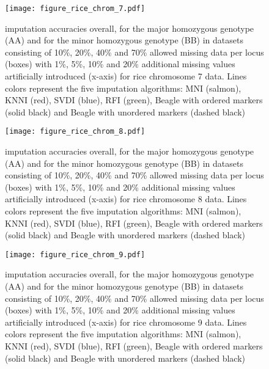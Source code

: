 \begin{figure}\texttt{[image: figure\_rice\_chrom\_7.pdf]}\caption{
imputation accuracies overall, for the major homozygous genotype (AA) and for the minor homozygous genotype (BB) in datasets consisting of
10\%, 20\%, 40\% and 70\% allowed missing data per locus (boxes) with 1\%, 5\%, 10\% and 20\%
additional missing values artificially introduced (x-axis) for rice chromosome 7 data.
Lines colors represent the five imputation algorithms: MNI (salmon), KNNI (red), SVDI (blue), RFI (green), Beagle with ordered markers (solid black) and Beagle with unordered markers (dashed black)}\end{figure}

\begin{figure}\texttt{[image: figure\_rice\_chrom\_8.pdf]}\caption{
imputation accuracies overall, for the major homozygous genotype (AA) and for the minor homozygous genotype (BB) in datasets consisting of
10\%, 20\%, 40\% and 70\% allowed missing data per locus (boxes) with 1\%, 5\%, 10\% and 20\%
additional missing values artificially introduced (x-axis) for rice chromosome 8 data.
Lines colors represent the five imputation algorithms: MNI (salmon), KNNI (red), SVDI (blue), RFI (green), Beagle with ordered markers (solid black) and Beagle with unordered markers (dashed black)}\end{figure}

\begin{figure}\texttt{[image: figure\_rice\_chrom\_9.pdf]}\caption{
imputation accuracies overall, for the major homozygous genotype (AA) and for the minor homozygous genotype (BB) in datasets consisting of
10\%, 20\%, 40\% and 70\% allowed missing data per locus (boxes) with 1\%, 5\%, 10\% and 20\%
additional missing values artificially introduced (x-axis) for rice chromosome 9 data.
Lines colors represent the five imputation algorithms: MNI (salmon), KNNI (red), SVDI (blue), RFI (green), Beagle with ordered markers (solid black) and Beagle with unordered markers (dashed black)}\end{figure}

